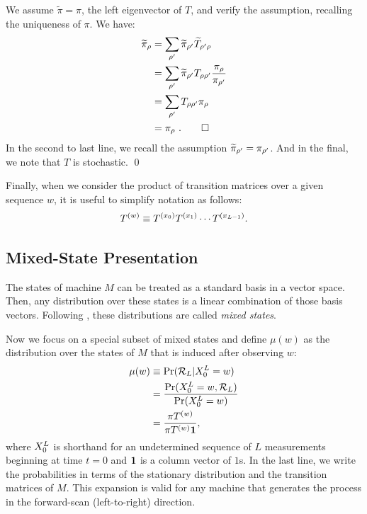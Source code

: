 \begin{ProProp}
We assume $\widetilde{\pi} = \pi$, the left eigenvector of $T$, and verify the
assumption, recalling the uniqueness of $\pi$. We have:
\begin{align*}
\widetilde{\pi}_\rho 
  &= 
\sum_{{\rho^{\prime}}} \widetilde{\pi}_{\rho^{\prime}} 
                            \widetilde{T}_{\rho^{\prime}\rho} \\
  &=
\sum_{{\rho^{\prime}}} \widetilde{\pi}_{\rho^{\prime}} 
                            T_{\rho\rho^{\prime}} 
                            \frac{\pi_\rho}{\pi_{{\rho^{\prime}}}} \\
 &= 
\sum_{{\rho^{\prime}}} T_{\rho\rho^{\prime}} 
                            \pi_\rho \\
 &= \pi_\rho ~.
\qed
\end{align*}
In the second to last line, we recall the assumption
$\widetilde{\pi}_{\rho^{\prime}} = \pi_{\rho^{\prime}}$.
And in the final, we note that $T$ is stochastic.
\qed
\end{ProProp}

Finally, when we consider the product
of transition matrices over a given sequence $w$, it is useful to simplify
notation as follows:
\begin{align*}
T^{(w)} \equiv T^{({x}_0)} T^{({x}_1)} \cdots 
               T^{({x}_{L-1})}.
\end{align*}

\subsection{Mixed-State Presentation}
\label{MSP}

The states of machine $M$ can be treated as a standard basis in a vector space.
Then, any distribution over these states is a linear combination of those
basis vectors. Following , these distributions are 
called \emph{mixed states}. 

Now we focus on a special subset of mixed states and define $\mu(w)$ as 
the distribution over the states of $M$ that is induced after observing $w$:
\begin{align}
\label{mixedstates}
\mu(w) 
  &\equiv \Pr(\mathcal{R}_L | {X}_0^L=w)  \\
  & = \frac{\Pr({X}_0^L=w, \mathcal{R}_L)}{\Pr({X}_0^L=w)} 
\\
  &= \frac{\pi T^{(w)}}{\pi T^{(w)} \mathbf{1}},
\end{align}
where ${X}_0^L$ is shorthand for an undetermined sequence of $L$ 
measurements beginning at time $t=0$ and $\mathbf{1}$ is a column vector of $1$s.
In the last line, we write the
probabilities in terms of the stationary distribution and the transition
matrices of $M$.  This expansion is valid for any machine that generates
the process in the forward-scan (left-to-right) direction.

